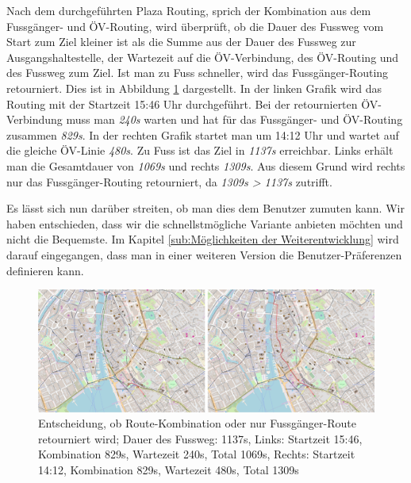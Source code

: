 Nach dem durchgeführten Plaza Routing, sprich der Kombination aus dem Fussgänger- und ÖV-Routing, wird überprüft, ob die Dauer des Fussweg vom Start zum Ziel kleiner ist als die Summe aus der Dauer des Fussweg zur Ausgangshaltestelle, der Wartezeit auf die ÖV-Verbindung, des ÖV-Routing und des Fussweg zum Ziel. Ist man zu Fuss schneller, wird das Fussgänger-Routing retourniert. Dies ist in Abbildung \ref{fig:qgis_plugin_plaza_route_walking_public_transport_comparison} dargestellt. In der linken Grafik wird das Routing mit der Startzeit 15:46 Uhr durchgeführt. Bei der retournierten ÖV-Verbindung muss man \emph{240s} warten und hat für das Fussgänger- und ÖV-Routing zusammen \emph{829s}.
In der rechten Grafik startet man um 14:12 Uhr und wartet auf die gleiche ÖV-Linie \emph{480s}. Zu Fuss ist das Ziel in \emph{1137s} erreichbar. Links erhält man die Gesamtdauer von \emph{1069s} und rechts \emph{1309s}.
Aus diesem Grund wird rechts nur das Fussgänger-Routing retourniert, da \emph{1309s > 1137s} zutrifft.

Es lässt sich nun darüber streiten, ob man dies dem Benutzer zumuten kann. Wir haben entschieden, dass wir die schnellstmögliche Variante anbieten möchten und nicht die Bequemste.
Im Kapitel \ref{sub:Möglichkeiten der Weiterentwicklung} wird darauf eingegangen, dass man in einer weiteren Version die Benutzer-Präferenzen definieren kann.

\begin{figure}[ht]
    \centering
    \includegraphics[width=1.0\linewidth]{projectdoc/img/qgis_plugin_plaza_route_walking_public_transport_comparison}
    \caption[Entscheidung, ob Route-Kombination oder nur Fussgänger-Route retourniert wird]{Entscheidung, ob Route-Kombination oder nur Fussgänger-Route retourniert wird; Dauer des Fussweg: 1137s, Links: Startzeit 15:46, Kombination 829s, Wartezeit 240s, Total 1069s, Rechts: Startzeit 14:12, Kombination 829s, Wartezeit 480s, Total 1309s}
    \label{fig:qgis_plugin_plaza_route_walking_public_transport_comparison}
\end{figure}

